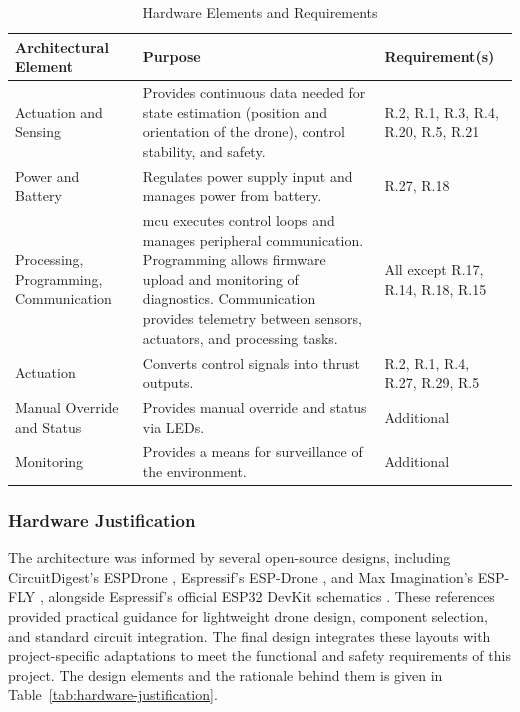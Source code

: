 \begin{table}[H]
\centering
\caption{Hardware Elements and Requirements}
\label{tab:hardware-arch}
\begin{tabular}{|m{}|m{}|m{}|}
\hline
\rowcolor{gray!15}
\textbf{Architectural Element} & \textbf{Purpose} & \textbf{Requirement(s)} \\
\hline
Actuation and Sensing & Provides continuous data needed for state estimation (position and orientation of the drone), control stability, and safety. & R.2, R.1, R.3, R.4, R.20, R.5, R.21 \\
\hline
Power and Battery  & Regulates power supply input and manages power from battery. & R.27, R.18 \\
\hline
Processing, Programming, Communication & \gls{mcu} executes control loops and manages peripheral communication. \newline
Programming allows firmware upload and monitoring of diagnostics. \newline
Communication provides telemetry between sensors, actuators, and processing tasks. & All except R.17, R.14, R.18, R.15 \\
\hline
Actuation & Converts control signals into thrust outputs. & R.2, R.1, R.4, R.27, R.29, R.5 \\
\hline
Manual Override and Status & Provides manual override and status via LEDs. & Additional \\
\hline
Monitoring & Provides a means for surveillance of the environment. & Additional \\
\hline
\end{tabular}
\end{table}

\subsubsection{Hardware Justification}

The architecture was informed by several open-source designs, including CircuitDigest’s ESPDrone \cite{espdrone_circuitdigest}, Espressif’s ESP-Drone \cite{espdrone_espressif}, and Max Imagination’s ESP-FLY \cite{maximagination}, alongside Espressif’s official ESP32 DevKit schematics \cite{espressif_devkits}. These references provided practical guidance for lightweight drone design, component selection, and standard circuit integration. The final design integrates these layouts with project-specific adaptations to meet the functional and safety requirements of this project. The design elements and the rationale behind them is given in Table~\ref{tab:hardware-justification}.

